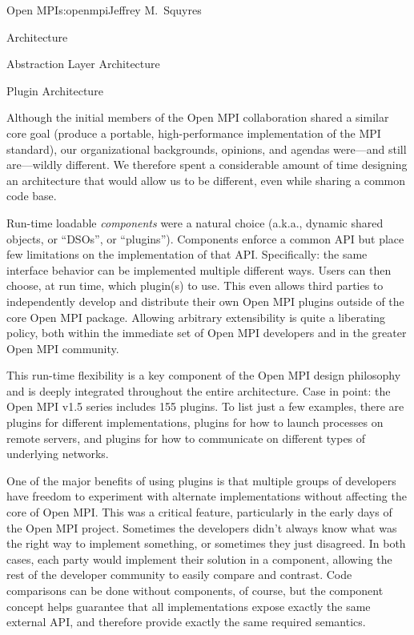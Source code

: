 \begin{aosachapter}{Open MPI}{s:openmpi}{Jeffrey M.\ Squyres}
\begin{aosasect1}{Architecture}
\begin{aosasect2}{Abstraction Layer Architecture}
\end{aosasect2}


\begin{aosasect2}{Plugin Architecture}


Although the initial members of the Open MPI collaboration shared a
similar core goal (produce a portable, high-performance
implementation of the MPI standard), our organizational backgrounds,
opinions, and agendas were---and still are---wildly different.
%
We therefore spent a considerable amount of time designing an
architecture that would allow us to be different, even while sharing
a common code base.

Run-time loadable \emph{components} were a natural choice (a.k.a.,
dynamic shared objects, or ``DSOs'', or ``plugins'').  Components
enforce a common API but place few limitations on the implementation
of that API.
%
Specifically: the same interface behavior can be implemented multiple
different ways.
%
Users can then choose, at run time, which plugin(s) to use.
%
This even allows third parties to independently develop and distribute
their own Open MPI plugins outside of the core Open MPI package.
%
Allowing arbitrary extensibility is quite a liberating policy, both
within the immediate set of Open MPI developers and in the greater
Open MPI community.

This run-time flexibility is a key component of the Open MPI design
philosophy and is deeply integrated throughout the entire
architecture.
%
Case in point: the Open MPI v1.5 series includes 155 plugins.
%
To list just a few examples, there are plugins for different  
implementations, plugins for how to launch processes on
remote servers, and plugins for how to communicate on different types
of underlying networks.

One of the major benefits of using plugins is that multiple groups of
developers have freedom to experiment with alternate implementations
without affecting the core of Open MPI.
%
This was a critical feature, particularly in the early days of the
Open MPI project.  Sometimes the developers didn't always know what
was the right way to implement something, or sometimes they just
disagreed.
%
In both cases, each party would implement their solution in a
component, allowing the rest of the developer community to easily
compare and contrast. 
%
Code comparisons can be done without components, of course, but the
component concept helps guarantee that all implementations expose
exactly the same external API, and therefore provide exactly the same
required semantics.  


\end{aosasect2}
\end{aosasect1}
\end{aosachapter}
